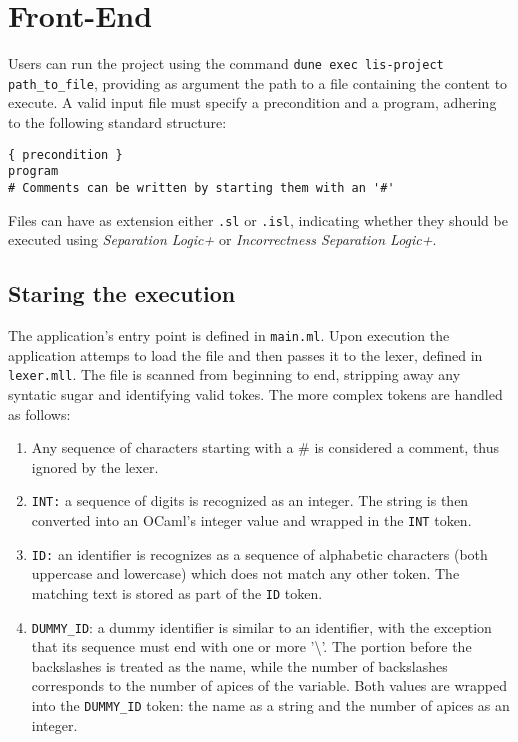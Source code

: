 \documentclass[parskip=half]{scrartcl}
\begin{document}
\section{Front-End}
Users can run the project using the command \texttt{dune exec lis-project path\_to\_file},
providing as argument the path to a file containing the content to execute.
A valid input file must specify a precondition and a program, adhering to the following standard structure:

\begin{verbatim}
{ precondition }
program
# Comments can be written by starting them with an '#'
\end{verbatim}

Files can have as extension either \texttt{.sl} or \texttt{.isl}, 
indicating whether they should be executed using 
\textit{Separation Logic+} or \textit{Incorrectness Separation Logic+}.


\subsection{Staring the execution}
The application's entry point is defined in \texttt{main.ml}.
Upon execution the application attemps to load the file and then passes it to the lexer, defined in \texttt{lexer.mll}. 
The file is scanned from beginning to end, stripping away any syntatic sugar and identifying valid tokes.
The more complex tokens are handled as follows:

\begin{enumerate}
  \item Any sequence of characters starting with a \# is considered a comment, thus ignored by the lexer.
  
  \item \texttt{INT:} a sequence of digits is recognized as an integer. 
  The string is then converted into an OCaml's integer value and wrapped in the \texttt{INT} token.
      

  \item \texttt{ID:} an identifier is recognizes as a sequence of alphabetic characters (both uppercase and lowercase) which does not match any other token. 
        The matching text is stored as part of the \texttt{ID} token.
  
  \item \texttt{DUMMY\_ID}: a dummy identifier is similar to an identifier, with the exception that
        its sequence must end with one or more '\textbackslash{}'.
        The portion before the backslashes is treated as the name, while the number of backslashes corresponds to the number of apices of the variable.
        Both values are wrapped into the \texttt{DUMMY\_ID} token: the name as a string and the number of apices as an integer.
\end{enumerate}
\end{document}
